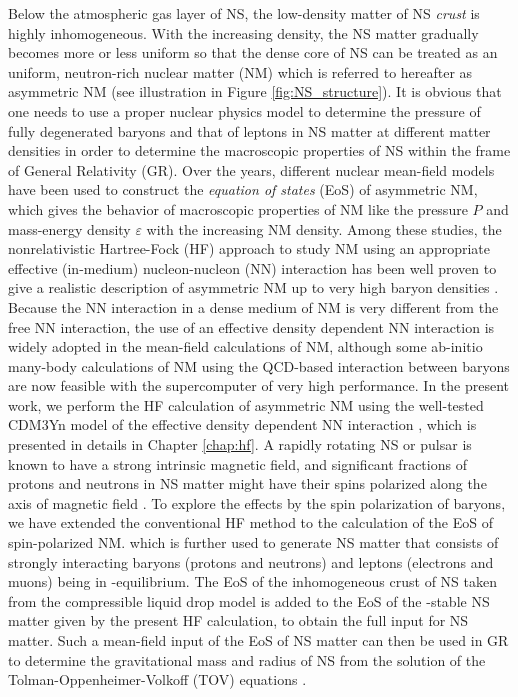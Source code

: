 Below the atmospheric gas layer of \gls{NS}, the low-density matter of NS \emph{crust}
is highly inhomogeneous. With the increasing density, the NS matter gradually becomes more 
or less uniform so that the dense core of NS can be treated as an uniform, neutron-rich
nuclear matter (NM) which is referred to hereafter as asymmetric NM (see illustration in  
Figure \ref{fig:NS_structure}). It is obvious that one needs to use a proper nuclear physics
model to determine the pressure of fully degenerated baryons and that of leptons in NS matter 
at different matter densities in order to determine the macroscopic properties of NS 
within the frame of General Relativity (GR). Over the years, different nuclear mean-field 
models have been used to construct the \emph{equation of states} (\gls{EoS}) of asymmetric NM, 
which gives the behavior of macroscopic properties of NM like the pressure $P$ and mass-energy 
density $\varepsilon$ with the increasing NM density. Among these studies, the nonrelativistic
Hartree-Fock (\gls{HF}) approach to study NM using an appropriate effective (in-medium) 
nucleon-nucleon (NN) interaction has been well proven to give a realistic description 
of asymmetric NM up to very high baryon densities \citep{khoa1996study}. Because the NN 
interaction in a dense medium of NM is very different from the free NN interaction, the use 
of an effective density dependent NN interaction is widely adopted in the mean-field 
calculations of NM, although
some ab-initio many-body calculations of NM using the QCD-based interaction between baryons
are now feasible with the supercomputer of very high performance. In the present work, we
perform the HF calculation of asymmetric NM using the well-tested CDM3Yn model of the effective
density dependent NN interaction \citep{tan2021equation}, which is presented in details
in Chapter \ref{chap:hf}. A rapidly rotating NS or pulsar is known to have a strong intrinsic
magnetic field, and significant fractions of protons and neutrons in NS matter might  
have their spins polarized along the axis of magnetic field \cite{broderick2000equation}. To explore the effects
by the spin polarization of baryons, we have extended the conventional HF method to the calculation
of the EoS of spin-polarized NM. which is further used to generate NS matter that consists 
of strongly interacting baryons (protons and neutrons) and leptons (electrons and muons) 
being in \textbeta-equilibrium. The EoS of the inhomogeneous crust of NS taken from the 
compressible liquid drop model \citep{douchin2000nuclear,douchin2001unified} is added to the \gls{EoS} of the \textbeta-stable 
NS matter given by the present \gls{HF} calculation, to obtain the full input
for NS matter. Such a mean-field input of the EoS of NS matter can then be used in GR 
to determine the gravitational mass and radius of NS \citep{tan2020spin,tan2021equation} 
from the solution of the Tolman-Oppenheimer-Volkoff (\gls{TOV}) equations \citep{oppenheimer1939massive}. 

